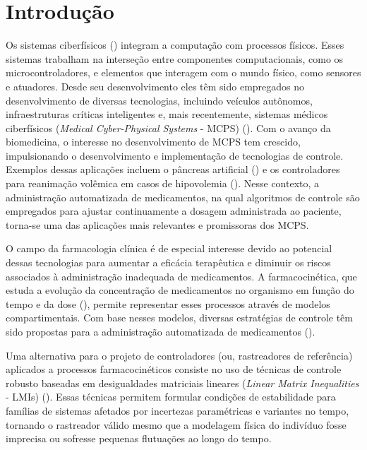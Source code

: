 \section{Introdução}
\label{sec:introducao}

Os sistemas ciberfísicos (\cite{lee2017embedded}) integram a computação com processos físicos. Esses sistemas trabalham na interseção entre componentes computacionais, como os microcontroladores, e elementos que interagem com o mundo físico, como sensores e atuadores. Desde seu desenvolvimento eles têm sido empregados no desenvolvimento de diversas tecnologias, incluindo veículos autônomos, infraestruturas críticas inteligentes e, mais recentemente, sistemas médicos ciberfísicos (\textit{Medical Cyber-Physical Systems} - MCPS) (\cite{dey2018medical}). Com o avanço da biomedicina, o interesse no desenvolvimento de MCPS tem crescido, impulsionando o desenvolvimento e implementação de tecnologias de controle. Exemplos dessas aplicações incluem o pâncreas artificial (\cite{brown2019six}) e os controladores para reanimação volêmica em casos de hipovolemia (\cite{kramer2008closed}). Nesse contexto, a administração automatizada de medicamentos, na qual algoritmos de controle são empregados para ajustar continuamente a dosagem administrada ao paciente, torna-se uma das aplicações mais relevantes e promissoras dos MCPS.

O campo da farmacologia clínica é de especial interesse devido ao potencial dessas tecnologias para aumentar a eficácia terapêutica e diminuir os riscos associados à administração inadequada de medicamentos. A farmacocinética, que estuda a evolução da concentração de medicamentos no organismo em função do tempo e da dose (\cite{bailey2005drug}), permite representar esses processos através de modelos compartimentais. Com base nesses modelos, diversas estratégias de controle têm sido propostas para a administração automatizada de medicamentos (\cite{gholami2013optimal,nogueira2016positive,padmanabhan2019optimal}).

Uma alternativa para o projeto de controladores (ou, rastreadores de referência) aplicados a processos farmacocinéticos consiste no uso de técnicas de controle robusto baseadas em desigualdades matriciais lineares (\textit{Linear Matrix Inequalities} - LMIs) (\cite{morais_reference,marcomini2025projeto}). Essas técnicas permitem formular condições de estabilidade para famílias de sistemas afetados por incertezas paramétricas e variantes no tempo, tornando o rastreador válido mesmo que a modelagem física do indivíduo fosse imprecisa ou sofresse pequenas flutuações ao longo do tempo. 

